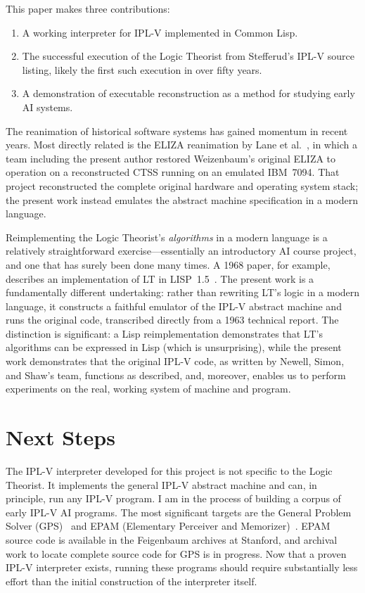 \documentclass[journal]{IEEEtran}
\begin{document}
This paper makes three contributions:

\begin{enumerate}
\item A working interpreter for IPL-V implemented in Common Lisp.
\item The successful execution of the Logic Theorist from Stefferud’s IPL-V source listing, likely the first such execution in over fifty years.
\item A demonstration of executable reconstruction as a method for studying early AI systems.
\end{enumerate}

The reanimation of historical software systems has gained momentum in
recent years. Most directly related is the ELIZA reanimation by Lane
et al.~\cite{lane2025eliza}, in which a team including the present
author restored Weizenbaum's original ELIZA to operation on a
reconstructed CTSS running on an emulated IBM~7094. That project
reconstructed the complete original hardware and operating system
stack; the present work instead emulates the abstract machine
specification in a modern language.

Reimplementing the Logic Theorist's \textit{algorithms} in a modern
language is a relatively straightforward exercise---essentially an
introductory AI course project, and one that has surely been done many
times. A 1968 paper, for example, describes an implementation of LT in
LISP~1.5~\cite{millstein1968logic}. The present work is a
fundamentally different undertaking: rather than rewriting LT's logic
in a modern language, it constructs a faithful emulator of the IPL-V
abstract machine and runs the original code, transcribed directly from
a 1963 technical report. The distinction is significant: a Lisp
reimplementation demonstrates that LT's algorithms can be expressed in
Lisp (which is unsurprising), while the present work demonstrates that
the original IPL-V code, as written by Newell, Simon, and Shaw's team,
functions as described, and, moreover, enables us to perform
experiments on the real, working system of machine and program.

\section{Next Steps}
\label{sec:next}

The IPL-V interpreter developed for this project is not specific to
the Logic Theorist. It implements the general IPL-V abstract machine
and can, in principle, run any IPL-V program. I am in the process of
building a corpus of early IPL-V AI programs. The most significant
targets are the General Problem Solver (GPS)~\cite{newell1959gps} and
EPAM (Elementary Perceiver and
Memorizer)~\cite{feigenbaum1961epam}. EPAM source code is available in
the Feigenbaum archives at Stanford, and archival work to locate
complete source code for GPS is in progress. Now that a proven IPL-V
interpreter exists, running these programs should require
substantially less effort than the initial construction of the
interpreter itself.
\end{document}
